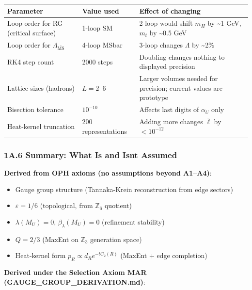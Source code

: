{\def\LTcaptype{none} %
\begin{longtable}[]{@{}lll@{}}
\toprule\noalign{}
Parameter & Value used & Effect of changing \\
\midrule\noalign{}
\endhead
\bottomrule\noalign{}
\endlastfoot
Loop order for RG (critical surface) & 1-loop SM & 2-loop would shift \(m_H\) by \textasciitilde1 GeV, \(m_t\) by \textasciitilde0.5 GeV \\
Loop order for \(\Lambda_{\overline{\text{MS}}}\) & 4-loop MSbar & 3-loop changes \(\Lambda\) by \textasciitilde2\% \\
RK4 step count & 2000 steps & Doubling changes nothing to displayed precision \\
Lattice sizes (hadrons) & \(L = 2\)--\(6\) & Larger volumes needed for precision; current values are prototype \\
Bisection tolerance & \(10^{-10}\) & Affects last digits of \(\alpha_U\) only \\
Heat-kernel truncation & 200 representations & Adding more changes \(\bar{\ell}\) by \(< 10^{-12}\) \\
\end{longtable}
}

\subsubsection{1A.6 Summary: What Is and Isn\textquotesingle t Assumed}\label{1a6-summary-what-is-and-isnt-assumed}

\textbf{Derived from OPH axioms (no assumptions beyond A1--A4)}:

\begin{itemize}
\tightlist
\item
  Gauge group structure (Tannaka-Krein reconstruction from edge sectors)
\item
  \(\varepsilon = 1/6\) (topological, from \(\mathbb{Z}_6\) quotient)
\item
  \(\lambda(M_U) = 0\), \(\beta_\lambda(M_U) = 0\) (refinement stability)
\item
  \(Q = 2/3\) (MaxEnt on \(\mathbb{Z}_3\) generation space)
\item
  Heat-kernel form \(p_R \propto d_R e^{-tC_2(R)}\) (MaxEnt + edge completion)
\end{itemize}

\textbf{Derived under the Selection Axiom MAR (GAUGE\_GROUP\_DERIVATION.md)}:

